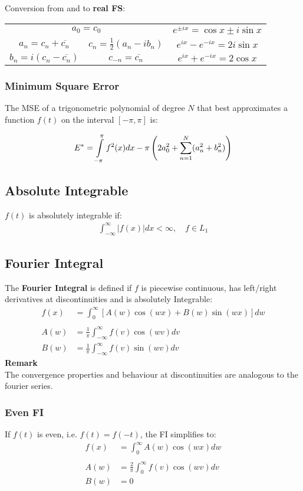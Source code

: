 Conversion from and to \textbf{real FS}:\\
\begin{tabular}[h]{c|c|c} %
    \multicolumn{2}{c}{$a_0=c_0$} & $e^{\pm ix}=\cos x\pm i\sin x$                             \\
    $a_n=c_n+\overline{c_n}$      & $c_n = \frac{1}{2}(a_n-ib_n)$  & $e^{ix}-e^{-ix}=2i\sin x$ \\
    $b_n=i(c_n-\overline{c_n})$   & $c_{-n}=\overline{c_n}$        & $e^{ix}+e^{-ix}=2\cos x$
\end{tabular}

\subsubsection{Minimum Square Error}
The MSE of a trigonometric polynomial of degree $N$ that best approximates a function $f(t)$ on the interval $[-\pi,\pi]$ is:

\begin{align*}
    E^*=\intop_{-\pi}^\pi f^2(x)dx-\pi\left(2a_0^2+\sum_{n=1}^N(a_n^2+b_n^2)\right)
\end{align*}

\subsection{Absolute Integrable}
$f(t)$ is absolutely integrable if:
\begin{align*}
    \int_{-\infty}^{\infty}\left|f(x)\right|dx<\infty ,\quad f\in L_1
\end{align*}
\subsection{Fourier Integral}
The \textbf{Fourier Integral} is defined if $f$ is piecewise continuous, has left/right derivatives at
discontinuities and is absolutely Integrable:
\begin{align*}
    f(x) & =\int_0^\infty[A(w)\cos(wx)+B(w)\sin(wx)]dw     \\\\
    A(w) & =\frac1\pi\int_{-\infty}^{\infty}f(v)\cos(wv)dv \\
    B(w) & =\frac1\pi\int_{-\infty}^{\infty}f(v)\sin(wv)dv
\end{align*}
\textbf{Remark}\\
The convergence properties and behaviour at discontinuities are analogous to the fourier series.
\subsubsection{Even FI}
If $f(t)$ is even, i.e. $f(t)=f(-t)$, the FI simplifies to:
\begin{align*}
    f(x) & =\int_0^\infty A(w)\cos(wx)dw          \\\\
    A(w) & =\frac2\pi\int_0^\infty f(v)\cos(wv)dv \\
    B(w) & =0
\end{align*}
